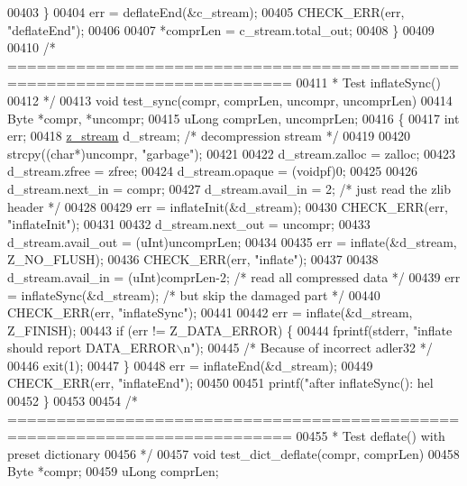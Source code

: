 \begin{DoxyCode}
{{{{{{{{{{{{{00403     \}
00404     err = deflateEnd(&c\_stream);
00405     CHECK\_ERR(err, \textcolor{stringliteral}{"deflateEnd"});
00406 
00407     *comprLen = c\_stream.total\_out;
00408 \}
00409 
00410 \textcolor{comment}{/* ===========================================================================}
00411 \textcolor{comment}{ * Test inflateSync()}
00412 \textcolor{comment}{ */}
00413 \textcolor{keywordtype}{void} test\_sync(compr, comprLen, uncompr, uncomprLen)
00414     Byte *compr, *uncompr;
00415     uLong comprLen, uncomprLen;
00416 \{
00417     \textcolor{keywordtype}{int} err;
00418     \hyperlink{structz__stream__s}{z\_stream} d\_stream; \textcolor{comment}{/* decompression stream */}
00419 
00420     strcpy((\textcolor{keywordtype}{char}*)uncompr, \textcolor{stringliteral}{"garbage"});
00421 
00422     d\_stream.zalloc = zalloc;
00423     d\_stream.zfree = zfree;
00424     d\_stream.opaque = (voidpf)0;
00425 
00426     d\_stream.next\_in  = compr;
00427     d\_stream.avail\_in = 2; \textcolor{comment}{/* just read the zlib header */}
00428 
00429     err = inflateInit(&d\_stream);
00430     CHECK\_ERR(err, \textcolor{stringliteral}{"inflateInit"});
00431 
00432     d\_stream.next\_out = uncompr;
00433     d\_stream.avail\_out = (uInt)uncomprLen;
00434 
00435     err = inflate(&d\_stream, Z\_NO\_FLUSH);
00436     CHECK\_ERR(err, \textcolor{stringliteral}{"inflate"});
00437 
00438     d\_stream.avail\_in = (uInt)comprLen-2;   \textcolor{comment}{/* read all compressed data */}
00439     err = inflateSync(&d\_stream);           \textcolor{comment}{/* but skip the damaged part */}
00440     CHECK\_ERR(err, \textcolor{stringliteral}{"inflateSync"});
00441 
00442     err = inflate(&d\_stream, Z\_FINISH);
00443     \textcolor{keywordflow}{if} (err != Z\_DATA\_ERROR) \{
00444         fprintf(stderr, \textcolor{stringliteral}{"inflate should report DATA\_ERROR\(\backslash\)n"});
00445         \textcolor{comment}{/* Because of incorrect adler32 */}
00446         exit(1);
00447     \}
00448     err = inflateEnd(&d\_stream);
00449     CHECK\_ERR(err, \textcolor{stringliteral}{"inflateEnd"});
00450 
00451     printf(\textcolor{stringliteral}{"after inflateSync(): hel%
00452 \}
00453 
00454 \textcolor{comment}{/* ===========================================================================}
00455 \textcolor{comment}{ * Test deflate() with preset dictionary}
00456 \textcolor{comment}{ */}
00457 \textcolor{keywordtype}{void} test\_dict\_deflate(compr, comprLen)
00458     Byte *compr;
00459     uLong comprLen;
}}}}}}}}}}}}}}
\end{DoxyCode}
